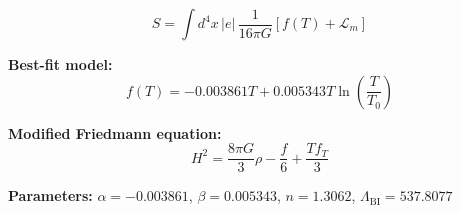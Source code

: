 
\begin{equation}
  S = \int d^4x \, |e| \, \frac{1}{16\pi G} \left[ f(T) + \mathcal{L}_m \right]
\end{equation}

\textbf{Best-fit model:}
\begin{equation}
  f(T) = -0.003861 T + 0.005343 T \ln\!\left(\frac{T}{T_0}\right)
\end{equation}

\textbf{Modified Friedmann equation:}
\begin{equation}
  H^2 = \frac{8\pi G}{3} \rho - \frac{f}{6} + \frac{T f_T}{3}
\end{equation}

\textbf{Parameters:}
$\alpha = -0.003861$, \quad
$\beta = 0.005343$, \quad
$n = 1.3062$, \quad
$\Lambda_{\text{BI}} = 537.8077$
